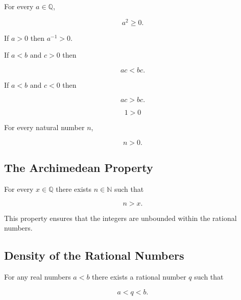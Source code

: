 \begin{theorem}
For every $a\in\mathbb{Q}$,

\[
a^2 \ge 0.
\]
\end{theorem}

\begin{theorem}
If $a>0$ then $a^{-1}>0$.
\end{theorem}

\begin{theorem}
If $a<b$ and $c>0$ then

\[
ac < bc .
\]
\end{theorem}

\begin{theorem}
If $a<b$ and $c<0$ then

\[
ac > bc .
\]
\end{theorem}

\begin{theorem}
\[
1>0
\]
\end{theorem}

\begin{corollary}

For every natural number $n$,

\[
n>0.
\]

\end{corollary}

\subsection{The Archimedean Property}

\begin{theorem}

For every $x\in\mathbb{Q}$ there exists $n\in\mathbb{N}$ such that

\[
n > x .
\]

\end{theorem}

This property ensures that the integers are unbounded within the rational
numbers.

\subsection{Density of the Rational Numbers}

\begin{theorem}

For any real numbers $a<b$ there exists a rational number $q$ such that

\[
a < q < b .
\]

\end{theorem}

